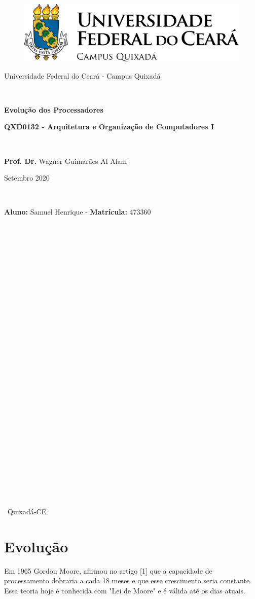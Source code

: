 \documentclass[12pt]{article}
\begin{document}
	\begin{center}
		\begin{figure}[h!]
			\centering
			\includegraphics[scale=0.4]{logoufcquix.png}
			
		\end{figure}
		
		\large{Universidade Federal do Ceará - Campus Quixadá}
		\
		
		\
		
		\Large {\textbf{Evolução dos Processadores}} 
		
		\textbf{QXD0132 - Arquitetura e Organização de Computadores I}
		
		\
		
		\large{\textbf{Prof. Dr.} Wagner Guimarães Al Alam}
		
		Setembro 2020
		
		\
		
		\textbf{Aluno:} Samuel Henrique - \textbf{Matrícula:} 473360 \\
		
		\
		
		\
		
		\
	\end{center}
	\begin{center}
		
		\
		
		\
		
		\
		
		\
		
		\
		
		\
		
		\
		
		\
		
		\
		
		\
		
		\
		
		\
		
		\
		
		\
		
		\
		Quixadá-CE \ \ \  
	\end{center} \par
	\thispagestyle{empty}
	\newpage
	\onehalfspacing
\section{Evolução} 
	Em 1965 Gordon Moore, afirmou no artigo [1] que a capacidade de processamento dobraria a cada 18 meses e que esse crescimento seria constante. Essa teoria hoje é conhecida com "Lei de Moore" e é válida até os dias atuais. \
	
\end{document}
